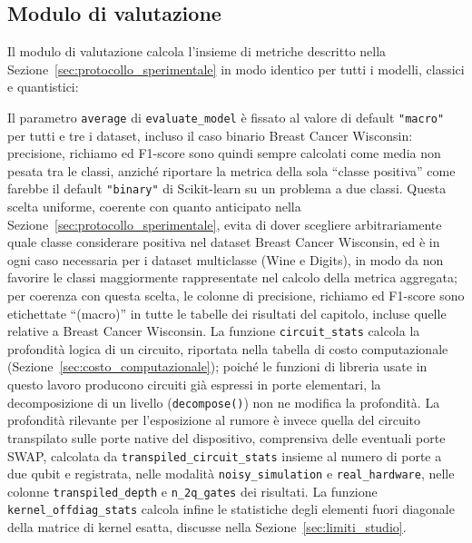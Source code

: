 \subsection{Modulo di valutazione}
\label{sec:impl_valutazione}

Il modulo di valutazione calcola l'insieme di metriche descritto nella Sezione~\ref{sec:protocollo_sperimentale} in modo identico per tutti i modelli, classici e quantistici:



Il parametro \texttt{average} di \texttt{evaluate\_model} è fissato al valore di default \texttt{"macro"} per tutti e tre i dataset, incluso il caso binario Breast Cancer Wisconsin: precisione, richiamo ed F1-score sono quindi sempre calcolati come media non pesata tra le classi, anziché riportare la metrica della sola ``classe positiva'' come farebbe il default \texttt{"binary"} di Scikit-learn su un problema a due classi. Questa scelta uniforme, coerente con quanto anticipato nella Sezione~\ref{sec:protocollo_sperimentale}, evita di dover scegliere arbitrariamente quale classe considerare positiva nel dataset Breast Cancer Wisconsin, ed è in ogni caso necessaria per i dataset multiclasse (Wine e Digits), in modo da non favorire le classi maggiormente rappresentate nel calcolo della metrica aggregata; per coerenza con questa scelta, le colonne di precisione, richiamo ed F1-score sono etichettate ``(macro)'' in tutte le tabelle dei risultati del capitolo, incluse quelle relative a Breast Cancer Wisconsin. La funzione \texttt{circuit\_stats} calcola la profondità logica di un circuito, riportata nella tabella di costo computazionale (Sezione~\ref{sec:costo_computazionale}); poiché le funzioni di libreria usate in questo lavoro producono circuiti già espressi in porte elementari, la decomposizione di un livello (\texttt{decompose()}) non ne modifica la profondità. La profondità rilevante per l'esposizione al rumore è invece quella del circuito transpilato sulle porte native del dispositivo, comprensiva delle eventuali porte SWAP, calcolata da \texttt{transpiled\_circuit\_stats} insieme al numero di porte a due qubit e registrata, nelle modalità \texttt{noisy\_simulation} e \texttt{real\_hardware}, nelle colonne \texttt{transpiled\_depth} e \texttt{n\_2q\_gates} dei risultati. La funzione \texttt{kernel\_offdiag\_stats} calcola infine le statistiche degli elementi fuori diagonale della matrice di kernel esatta, discusse nella Sezione~\ref{sec:limiti_studio}.

